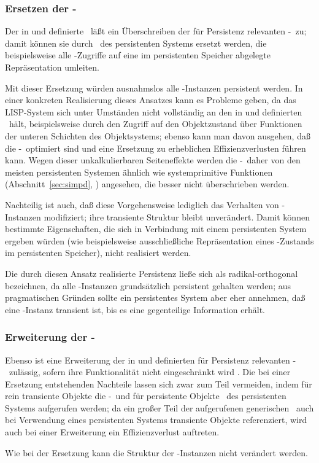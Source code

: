 \subsubsection{Ersetzen der \protect\std-\protect\mtd[n]}
%
Der in \cite{bib:st90} und \cite{bib:amop91} definierte
\std\ l\"{a}\ss{}t ein \"{U}berschreiben der f\"{u}r Persistenz relevanten
\std-\mtd[n]\ zu; damit k\"{o}nnen sie durch \mtd[n]\ des
persistenten Systems ersetzt werden, die beispielsweise 
alle \Slt\/-Zugriffe auf eine im persistenten Speicher abgelegte
Repr\"{a}sentation umleiten.
%
\par{}Mit dieser Ersetzung w\"{u}rden ausnahmslos alle \clos-Instanzen
persistent werden. In einer konkreten Realisierung dieses Ansatzes
kann es Probleme geben, da das LISP-System sich unter Umst\"{a}nden nicht
vollst\"{a}ndig an den in \cite{bib:st90} und \cite{bib:amop91}
definierten \std\ h\"{a}lt, beispielsweise durch den Zugriff auf
den Objektzustand \"{u}ber Funktionen der unteren Schichten des
Objektsystems; ebenso kann man davon ausgehen, da\ss{} die
\std-\mtd[n]\ optimiert sind und eine Ersetzung zu erheblichen
Effizienzverlusten f\"{u}hren kann. Wegen dieser unkalkulierbaren
Seiteneffekte werden die \std-\mtd[n]\ daher von den meisten
persistenten Systemen \"{a}hnlich wie systemprimitive Funktionen
(Abschnitt~\ref{sec:simpd}, \citepage{\pageref{sec:simpd}}) angesehen,
die besser nicht \"{u}berschrieben werden.
%
\par{}Nachteilig ist auch, da\ss{} diese Vorgehensweise lediglich das
Verhalten von \clos-Instanzen modifiziert; ihre transiente Struktur
bleibt unver\"{a}ndert. Damit k\"{o}nnen bestimmte Eigenschaften, die sich
in Verbindung mit einem persistenten System ergeben w\"{u}rden (wie
beispielsweise ausschlie\ss{}liche Repr\"{a}sentation eines \Slt\/-Zustands
im persistenten Speicher), nicht realisiert werden.
%
\par{}Die durch diesen Ansatz realisierte Persistenz lie\ss{}e sich als
radikal-orthogonal bezeichnen, da alle \clos-Instanzen grunds\"{a}tzlich
persistent gehalten werden; aus pragmatischen Gr\"{u}nden sollte ein
persistentes System aber eher annehmen, da\ss{} eine \clos-Instanz
transient ist, bis es eine gegenteilige Information erh\"{a}lt.
%
\subsubsection{Erweiterung der \protect\std-\protect\mtd[n]}
%
Ebenso ist eine Erweiterung der in \cite{bib:st90} und
\cite{bib:amop91} definierten f\"{u}r Persistenz relevanten
\std-\mtd[n]\ zul\"{a}ssig, sofern ihre Funktionalit\"{a}t
nicht eingeschr\"{a}nkt wird . Die bei einer Ersetzung
entstehenden Nachteile lassen sich zwar zum Teil vermeiden, indem f\"{u}r
rein transiente Objekte die \std-\mtd[n]\ und f\"{u}r persistente
Objekte \fn[en]\ des persistenten Systems aufgerufen werden; da ein
gro\ss{}er Teil der aufgerufenen generischen \fn[en]\ auch bei Verwendung
eines persistenten Systems transiente Objekte referenziert, wird auch
bei einer Erweiterung ein Effizienzverlust auftreten.
%
\par{}Wie bei der Ersetzung kann die Struktur der \clos-Instanzen
nicht ver\"{a}ndert werden.
%
